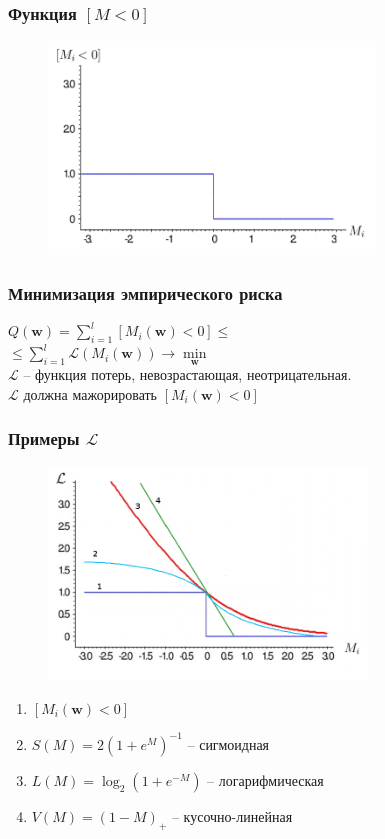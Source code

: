 \documentclass[12pt]{beamer}
\begin{document}
\begin{frame}\frametitle{Функция $[M<0]$}
\begin{figure}[htbp]
  \includegraphics[height=160pt, keepaspectratio = true]{images/l1}
\end{figure}
\end{frame}


\begin{frame}\frametitle{Минимизация эмпирического риска}
${Q(\mathbf{w}) = \sum\limits_{i=1}^l \left[ M_i(\mathbf{w}) < 0 \right] \leq}$\\ \vspace{3mm}
\hspace{10mm} ${\leq \sum\limits_{i=1}^l \mathcal{L}(M_i(\mathbf{w})) \rightarrow \min\limits_{\mathbf{w}} }$\\\vspace{3mm}
$\mathcal{L}$ -- функция потерь, невозрастающая, неотрицательная.\\
$\mathcal{L}$ должна мажорировать $\left[M_i(\mathbf{w}) < 0 \right]$
\end{frame}

\begin{frame}\frametitle{Примеры $\mathcal{L}$}
\begin{figure}[htbp]
  \includegraphics[height=160pt, keepaspectratio = true]{images/l}
\end{figure}
\begin{enumerate}
\item $\left[M_i(\mathbf{w}) < 0 \right]$
\item $S(M) = 2(1+e^M)^{-1}$ -- сигмоидная
\item $L(M) = \log_2(1+e^{-M})$ -- логарифмическая
\item $V(M) = (1-M)_+$ -- кусочно-линейная
\end{enumerate}
\end{frame}
\end{document}
